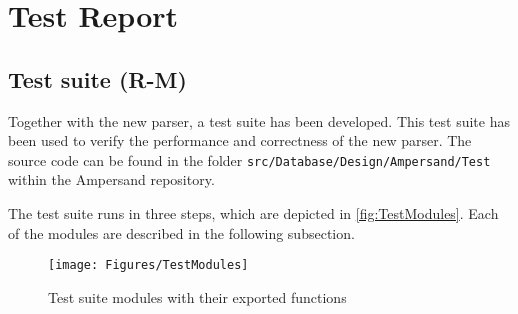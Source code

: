 
\section{Test Report}
\label{sec:tests}

\subsection{Test suite (R-M)}
  Together with the new parser, a test suite has been developed.
  This test suite has been used to verify the performance and correctness of the new parser.
  The source code can be found in the folder \texttt{src/Database/Design/Ampersand/Test} within the Ampersand repository.

  The test suite runs in three steps, which are depicted in \autoref{fig:TestModules}.
  Each of the modules are described in the following subsection.
  \begin{figure}[ht]%
    \texttt{[image: Figures/TestModules]}
    \caption{Test suite modules with their exported functions}
    \label{fig:TestModules}
  \end{figure}%

